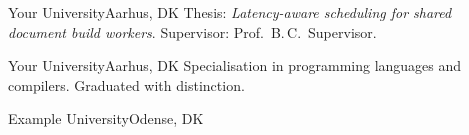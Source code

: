 
  {Your University}{Aarhus, DK}
  {Thesis: \emph{Latency-aware scheduling for shared document build
   workers}. Supervisor: Prof.\ B.\,C.\ Supervisor.}

  {Your University}{Aarhus, DK}
  {Specialisation in programming languages and compilers.
   Graduated with distinction.}

  {Example University}{Odense, DK}{}

